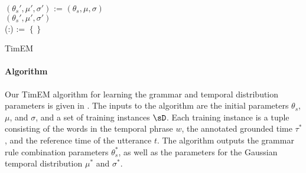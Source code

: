 \begin{algorithm}[t]
	$(\theta_s',\mu',\sigma')$ := $(\theta_s,\mu,\sigma)$ \\
	\KwRet $(\theta_s',\mu',\sigma')$ \\

	\BlankLine
	\BlankLine
	\Begin(:){
		\sH := $\left\{\right\}$ \\
		\Return{\sH}
	}

	\caption{
		\label{alg:pseudocode}
		TimEM 
	}
\end{algorithm}

\paragraph{Algorithm}
Our TimEM algorithm for learning the grammar and temporal distribution 
	parameters is given in .
The inputs to the algorithm are the initial parameters $\theta_s$,$\mu$, and
	$\sigma$, and a set of training instances $\sD$.
Each training instance is a tuple consisting of the words in the temporal
	phrase $w$, the annotated grounded time $\tau^*$, and the reference time
	of the utterance $t$.
The algorithm outputs the grammar rule combination parameters $\theta_s^*$,
	as well as the parameters for the Gaussian temporal distribution
	$\mu^*$ and $\sigma^*$.

